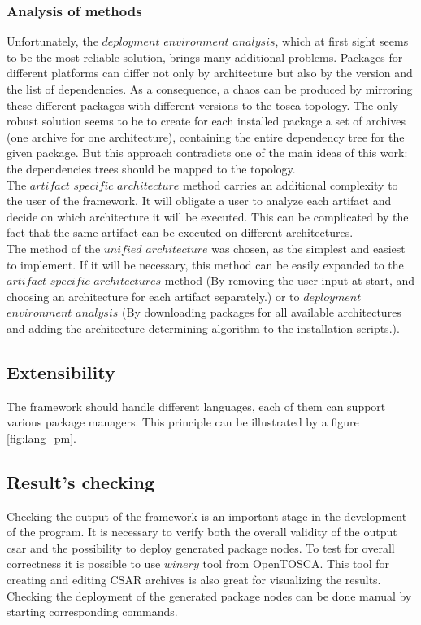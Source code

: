 \subsubsection*{Analysis of methods}
Unfortunately, the $deployment$ $environment$ $analysis$, which at first sight seems to be the most reliable solution, brings many additional problems.
Packages for different platforms can differ not only by architecture but also by the version and the list of dependencies.
As a consequence, a chaos can be produced by mirroring these different packages with different versions to the \gls{tosca}-topology.
The only robust solution seems to be to create for each installed package a set of archives (one archive for one architecture), containing the entire dependency tree for the given package.
But this approach contradicts one of the main ideas of this work: the dependencies trees should be mapped to the topology.\\
The $artifact$ $specific$ $architecture$ method carries an additional complexity to the user of the framework.
It will obligate a user to analyze each artifact and decide on which architecture it will be executed. 
This can be complicated by the fact that the same artifact can be executed on different architectures.\\
The method of the $unified$ $architecture$ was chosen, as the simplest and easiest to implement.
If it will be necessary, this method can be easily expanded to the $artifact$ $specific$ $architectures$ method (By removing the user input at start, and choosing an architecture for each artifact separately.) or to $deployment$ $environment$ $analysis$ (By downloading packages for all available architectures and adding the architecture determining algorithm to the installation scripts.).

\subsection{Extensibility}
The framework should handle different languages, each of them can support various package managers.
This principle can be illustrated by a figure \ref{fig:lang_pm}.


\subsection{Result's checking}
Checking the output of the framework is an important stage in the development of the program.
It is necessary to verify both the overall validity of the output \gls{csar} and the possibility to deploy generated package nodes.
To test for overall correctness it is possible to use $winery$ tool from OpenTOSCA.
This tool for creating and editing CSAR archives is also great for visualizing the results.
Checking the deployment of the generated package nodes can be done manual by starting corresponding commands.

